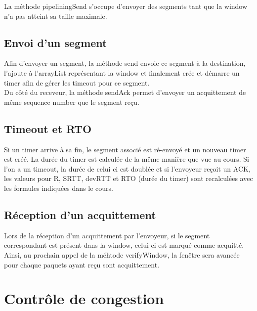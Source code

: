 \documentclass{article}
\begin{document}
La méthode pipeliningSend s'occupe d'envoyer des segments tant que la window n'a pas atteint sa taille maximale.

\subsection{Envoi d'un segment}

Afin d'envoyer un segment, la méthode send envoie ce segment à la destination, l'ajoute à l'arrayList représentant la window et finalement crée et démarre un timer afin de gérer les timeout pour ce segment.\\
Du côté du receveur, la méthode sendAck permet d'envoyer un acquittement de même sequence number que le segment reçu.

\subsection{Timeout et RTO}

Si un timer arrive à sa fin, le segment associé est ré-envoyé et un nouveau timer est créé. 
La durée du timer est calculée de la même manière que vue au cours.
Si l'on a un timeout, la durée de celui ci est doublée et si l'envoyeur reçoit un ACK, les valeurs pour R, SRTT, devRTT et RTO (durée du timer) sont recalculées avec les formules indiquées dans le cours.

\subsection{Réception d'un acquittement}

Lors de la réception d'un acquittement par l'envoyeur, si le segment correspondant est présent dans la window, celui-ci est marqué comme acquitté.
Ainsi, au prochain appel de la méhtode verifyWindow, la fenêtre sera avancée pour chaque paquets ayant reçu sont acquittement. 

\section{Contrôle de congestion}
\end{document}

